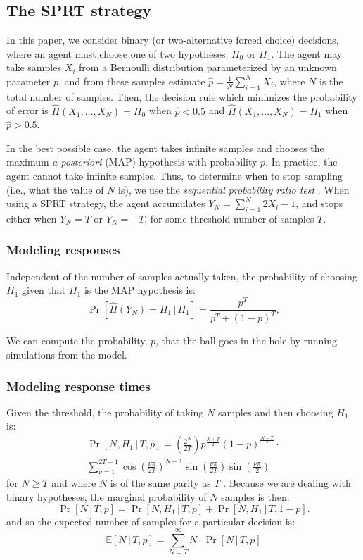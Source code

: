 \documentclass[10pt,letterpaper]{article}
\begin{document}
\subsection{The SPRT strategy}

In this paper, we consider binary (or two-alternative forced choice) decisions, where an agent must choose one of two hypotheses, $H_0$ or $H_1$. The agent may take samples $X_i$ from a Bernoulli distribution parameterized by an unknown parameter $p$, and from these samples estimate $\hat{p}=\frac{1}{N}\sum_{i=1}^N X_i$, where $N$ is the total number of samples. Then, the decision rule which minimizes the probability of error is $\hat{H}(X_1,\ldots{},X_N)=H_0$ when $\hat{p}<0.5$ and $\hat{H}(X_1,\ldots{},X_N)=H_1$ when $\hat{p}>0.5$.

In the best possible case, the agent takes infinite samples and chooses the maximum \emph{a posteriori} (MAP) hypothesis with probability $p$. In practice, the agent cannot take infinite samples. Thus, to determine when to stop sampling (i.e., what the value of $N$ is), we use the \emph{sequential probability ratio test} \cite{wald1947sequential}. When using a SPRT strategy, the agent accumulates $Y_N=\sum_{i=1}^N 2X_i-1$, and stops either when $Y_N=T$ or $Y_N=-T$, for some threshold number of samples $T$. 

\subsubsection{Modeling responses} Independent of the number of samples actually taken, the probability of choosing $H_1$ given that $H_1$ is the MAP hypothesis is:
\begin{equation}
\Pr[\hat{H}(Y_N)=H_1\,|\,H_1]=\frac{p^T}{p^T+(1-p)^T},
\label{eq:pr-choose-h1}
\end{equation}

We can compute the probability, $p$, that the ball goes in the hole by running simulations from the model.

\subsubsection{Modeling response times} Given the threshold, the probability of taking $N$ samples and then choosing $H_1$ is:
\begin{multline}
\Pr[N,H_1\,|\,T,p]=\left(\frac{2^N}{2T}\right)p^{\frac{N+T}{2}}(1-p)^{\frac{N-T}{2}}\cdot{}\\
\sum_{\nu=1}^{2T-1}\cos\left(\frac{\nu\pi}{2T}\right)^{N-1}\sin\left(\frac{\nu\pi}{2T}\right)\sin\left(\frac{\nu\pi}{2}\right)
\end{multline}
for $N\geq T$ and where $N$ is of the same parity as $T$ \cite[ch.~XIV, eq. 5.7]{Feller:1968ut}. Because we are dealing with binary hypotheses, the marginal probability of $N$ samples is then:
\begin{equation}
\Pr[N\,|\,T,p]=\Pr[N,H_1\,|\,T,p]+\Pr[N,H_1\,|\,T,1-p].
\label{eq:pr-n}
\end{equation}
and so the expected number of samples for a particular decision is:
\begin{equation}
\mathbb{E}[N\,|\,T,p]=\sum_{N=T}^\infty N\cdot{}\Pr[N\,|\,T,p]
\end{equation}
\end{document}
